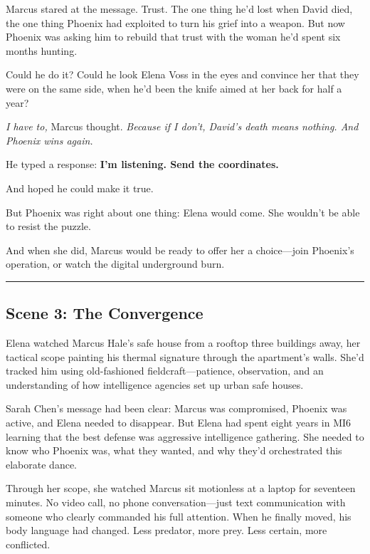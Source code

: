 \documentclass[12pt,letterpaper]{book}
\begin{document}
Marcus stared at the message. Trust. The one thing he'd lost when David died, the one thing Phoenix had exploited to turn his grief into a weapon. But now Phoenix was asking him to rebuild that trust with the woman he'd spent six months hunting.

Could he do it? Could he look Elena Voss in the eyes and convince her that they were on the same side, when he'd been the knife aimed at her back for half a year?

\emph{I have to,} Marcus thought. \emph{Because if I don't, David's death means nothing. And Phoenix wins again.}

He typed a response: \textbf{I'm listening. Send the coordinates.}

And hoped he could make it true.

But Phoenix was right about one thing: Elena would come. She wouldn't be able to resist the puzzle.

And when she did, Marcus would be ready to offer her a choice---join Phoenix's operation, or watch the digital underground burn.

\begin{center}\rule{0.5\linewidth}{0.5pt}\end{center}

\hypertarget{scene-3-the-convergence}{%
\subsection{Scene 3: The Convergence}\label{scene-3-the-convergence}}

Elena watched Marcus Hale's safe house from a rooftop three buildings away, her tactical scope painting his thermal signature through the apartment's walls. She'd tracked him using old-fashioned fieldcraft---patience, observation, and an understanding of how intelligence agencies set up urban safe houses.

Sarah Chen's message had been clear: Marcus was compromised, Phoenix was active, and Elena needed to disappear. But Elena had spent eight years in MI6 learning that the best defense was aggressive intelligence gathering. She needed to know who Phoenix was, what they wanted, and why they'd orchestrated this elaborate dance.

Through her scope, she watched Marcus sit motionless at a laptop for seventeen minutes. No video call, no phone conversation---just text communication with someone who clearly commanded his full attention. When he finally moved, his body language had changed. Less predator, more prey. Less certain, more conflicted.
\end{document}
